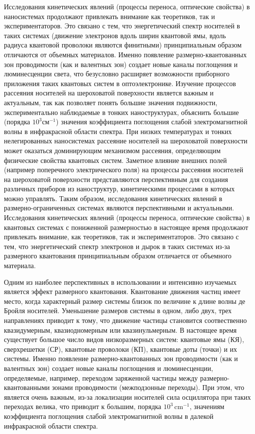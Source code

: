 {\actuality}
\ifsynopsis
Исследования кинетических явлений (процессы переноса, оптические свойства) в наносистемах продолжают привлекать внимание как теоретиков, так и экспериментаторов. Это связано с тем, что энергетический спектр носителей в таких системах (движение электронов вдоль ширин квантовой ямы, вдоль радиуса квантовой проволоки являются финитными) принципиальным образом отличаются от объемных материалов.
Именно появление размерно-квантованных зон проводимости (как и валентных зон) создает новые каналы поглощения и люминесценции света, что безусловно расширяет возможности приборного приложения таких квантовых систем в оптоэлектронике. Изучение процессов рассеяния носителей на шероховатой поверхности является важным и актуальным, так как позволяет понять большие значения подвижности, экспериментально наблюдаемые в тонких наноструктурах, объяснить большие (порядка $10^3$см$^{-1}$) значения коэффициента поглощения слабой электромагнитной волны в инфракрасной области спектра. При низких температурах и тонких нелегированных наносистемах рассеяние носителей на шероховатой поверхности может оказаться доминирующим механизмом рассеяния, определяющим физические свойства квантовых систем. Заметное влияние внешних полей (например поперечного электрического поля) на процессы рассеяния носителей на шероховатой поверхности представляются перспективным для создания различных приборов из наноструктур, кинетическими процессами в которых можно управлять.
Таким образом, исследования кинетических явлений в размерно-ограниченных системах являются перспективными и актуальными.
\else
Исследования кинетических явлений (процессы переноса, оптические свойства) в квантовых системах с пониженной размерностью в настоящее время продолжают привлекать внимание, как теоретиков, так и экспериментаторов. Это связано с тем, что энергетический спектр электронов и дырок в таких системах из-за размерного квантования принципиальным образом отличается от объемного материала.

Одним из наиболее перспективных в использовании и интенсивно изучаемых является эффект размерного квантования. Квантование движения частиц имеет место, когда характерный размер системы близок по величине к длине волны де Бройля носителей. Уменьшение размеров системы в одном, либо двух, трех направлениях приводит к тому, что движение частицы становится соотвественно квазидумерным, квазиодномерным или квазинульмерным. В настоящее время существует большое число видов низкоразмерных систем: квантовые ямы (КЯ), сверхрешетки (СР), квантовые проволоки (КП), квантовые доты (точки) и их системы. Именно появление размерно-квантованных зон проводимости (как и валентных зон) создает новые каналы поглощения и люминесценции, определяемые, например, переходом заряженной частицы между размерно-квантованными зонами проводимости (межподзонные переходы). При этом, что является очень важным, из-за локализации носителей сила осциллятора при таких переходах велика, что приводит к большим, порядка $10^3\,\text{cm}^{-1}$, значениям коэффициента поглощения слабой электромагнитной волны в далекой инфракрасной области спектра.

